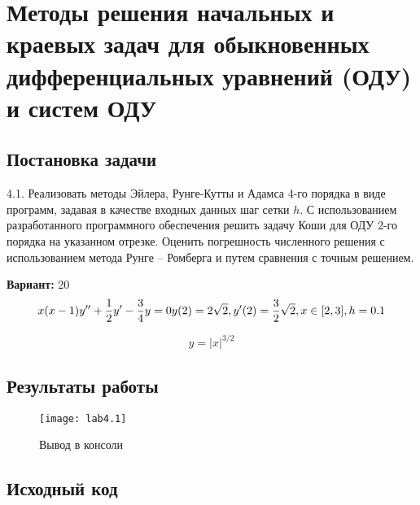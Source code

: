 \section{Методы решения начальных и краевых задач для обыкновенных дифференциальных уравнений (ОДУ) и систем ОДУ}

\subsection{Постановка задачи}
4.1. Реализовать методы Эйлера, Рунге-Кутты и Адамса 4-го порядка в виде программ, задавая в качестве входных данных шаг сетки $h$. С использованием разработанного программного обеспечения решить задачу Коши для ОДУ 2-го порядка на указанном отрезке. Оценить погрешность численного решения с использованием метода Рунге – Ромберга и путем сравнения с точным решением. 

{\bfseries Вариант:} 20
    \begin{equation}
        x(x - 1)y'' + \frac{1}{2} y' - \frac{3}{4} y = 0\\
        y(2) = 2\sqrt{2}, \\
        y'(2) = \frac{3}{2} \sqrt{2}, \\
        x \in [2,3], h = 0.1
    \end{equation}
    
    \begin{equation}
		y = |x|^{3/2}
    \end{equation}
\pagebreak

\subsection{Результаты работы}
\begin{figure}[h!]
\centering
\texttt{[image: lab4.1]}
\caption{Вывод в консоли}
\end{figure}


\subsection{Исходный код}


\pagebreak